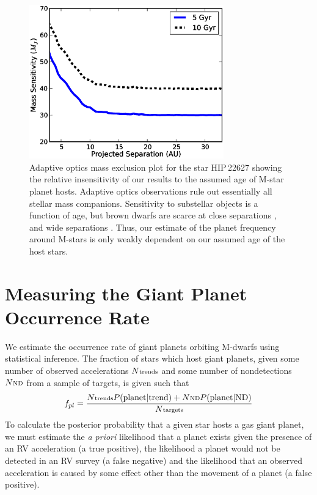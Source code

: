 \begin{figure}[htbp]
\centerline{\includegraphics[width=0.75\textwidth]{chapter3/f8.eps}}
\caption[Mass exclusion plot for HIP\,22627 showing the insensitivity of our results to assumed stellar age]{Adaptive optics mass exclusion plot for the star HIP\,22627 showing the relative insensitivity of our results to the assumed age of M-star planet hosts. Adaptive optics observations rule out essentially all stellar mass companions. Sensitivity to substellar objects is a function of age, but brown dwarfs are scarce at close separations \citep{Marcy00}, and wide separations \citep{Metchev09}. Thus, our estimate of the planet frequency around M-stars is only weakly dependent on our assumed age of the host stars.  
  }
\label{AgeAO}
\end{figure}



\section{Measuring the Giant Planet Occurrence Rate}
\label{Stats}

We estimate the occurrence rate of giant planets orbiting M-dwarfs using statistical inference. The fraction of stars which host giant planets, given some number of observed accelerations $N\scriptsize{\mbox{trends}}$ and some number of nondetections $N\scriptsize{\mbox{ND}}$ from a sample of targets, is given such that
\begin{equation}f_{pl} = \frac{N\scriptsize{\mbox{trends}}\normalsize P(\mbox{planet}|\mbox{trend}) + N\scriptsize{\mbox{ND}}\normalsize P(\mbox{planet}|\mbox{ND})}{N\scriptsize{\mbox{targets}}}
\label{ResultEq}
\end{equation}
To calculate the posterior probability that a given star hosts a gas giant planet, we must estimate the \textit{a priori} likelihood that a planet exists given the presence of an RV acceleration (a true positive), the likelihood a planet would not be detected in an RV survey (a false negative) and the likelihood that an observed acceleration is caused by some effect other than the movement of a planet (a false positive). 

